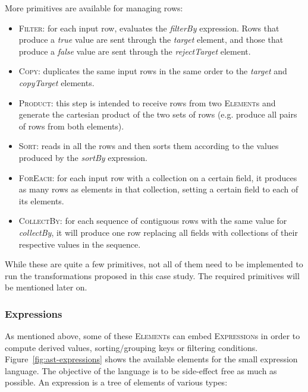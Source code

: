 \documentclass[a4paper]{scrartcl}
\newcommand*{\class}[1]{\textsc{#1}}
\begin{document}
More primitives are available for managing rows:

\begin{itemize}
\item \class{Filter}: for each input row, evaluates the
  \emph{filterBy} expression. Rows that produce a \emph{true} value
  are sent through the \emph{target} element, and those that produce a
  \emph{false} value are sent through the \emph{rejectTarget} element.

\item \class{Copy}: duplicates the same input rows in the same order
  to the \emph{target} and \emph{copyTarget} elements.

\item \class{Product}: this step is intended to receive rows from two
  \class{Element}s and generate the cartesian product of the two sets
  of rows (e.g. produce all pairs of rows from both elements).

\item \class{Sort}: reads in all the rows and then sorts them
  according to the values produced by the \emph{sortBy} expression.

\item \class{ForEach}: for each input row with a collection on a
  certain field, it produces as many rows as elements in that
  collection, setting a certain field to each of its elements.

\item \class{CollectBy}: for each sequence of contiguous rows with the
  same value for \emph{collectBy}, it will produce one row replacing
  all fields with collections of their respective values in the
  sequence.
\end{itemize}

While these are quite a few primitives, not all of them need to be
implemented to run the transformations proposed in this case
study. The required primitives will be mentioned later on.

\subsubsection{Expressions}

As mentioned above, some of these \class{Element}s can embed
\class{Expression}s in order to compute derived values,
sorting/grouping keys or filtering
conditions. Figure~\ref{fig:ast-expressions} shows the available
elements for the small expression language. The objective of the
language is to be side-effect free as much as possible. An expression
is a tree of elements of various types:
\end{document}
